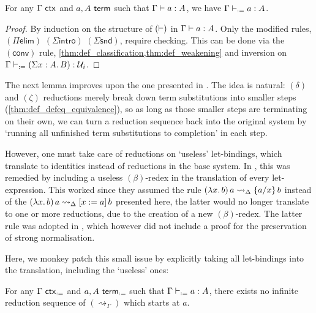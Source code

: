 \documentclass[twoside]{report}
\begin{document}
\begin{proposition}[Completeness]
    \label{thm:def_completeness}
    For any $\Gamma \ctxo$ and $a, A \termo$ such that $\Gamma \vdasho a : A$, we have $\Gamma \vdashd a : A$.
\end{proposition}

\begin{proof}
    By induction on the structure of $(\vdasho)$ in $\Gamma \vdasho a : A$. Only the modified rules, $(\Pi\mathsf{elim})$ $(\Sigma\mathsf{intro})$ $(\Sigma\mathsf{snd})$, require checking. This can be done via the $(\mathsf{conv})$ rule, \cref{thm:def_classification,thm:def_weakening} and inversion on $\Gamma \vdashd (\sig x A B) : \mathcal U_i$.
\end{proof}

The next lemma improves upon the one presented in \cite{severi1994pure}. The idea is natural: $(\delta)$ and $(\zeta)$ reductions merely break down term substitutions into smaller steps (\cref{thm:def_defeq_equivalence}), so as long as those smaller steps are terminating on their own, we can turn a reduction sequence back into the original system by `running all unfinished term substitutions to completion' in each step.

However, one must take care of reductions on `useless' let-bindings, which translate to identities instead of reductions in the base system. In \cite{severi1994pure}, this was remedied by including a useless $(\beta)$-redex in the translation of every let-expression. This worked since they assumed the rule $\app {(\lam x b)} a \rightsquigarrow_\Delta \subst x a b$ instead of the $\app {(\lam x b)} a \rightsquigarrow_\Delta \llet x a b$ presented here, the latter would no longer translate to one or more reductions, due to the creation of a new $(\beta)$-redex. The latter rule was adopted in \cite{mcbride2000dependently}, which however did not include a proof for the preservation of strong normalisation.

Here, we monkey patch this small issue by explicitly taking all let-bindings into the translation, including the `useless' ones:

\begin{proposition}
    \label{thm:def_red_termination}
    For any $\Gamma \ctxd$ and $a,A \termd$ such that $\Gamma \vdashd a : A$, there exists no infinite reduction sequence of $(\rightsquigarrow_\Gamma)$ which starts at $a$.
\end{proposition}
\end{document}
